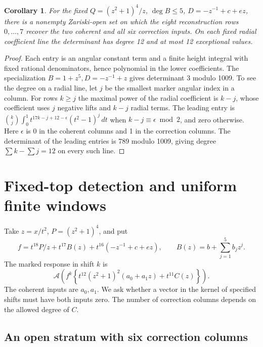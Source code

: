 \documentclass[11pt]{article}
\newtheorem{corollary}[theorem]{Corollary}
\newcommand{\A}{\mathcal A}
\begin{document}
\begin{corollary}\label{cor:generic-eight-row}
For the fixed \(Q=(z^2+1)^4/z\), \(\deg B\le5\),
\(D=-z^{-1}+c+ez\), there is a nonempty Zariski-open set
on which the eight reconstruction rows \(0,\ldots,7\)
recover the two coherent and all six correction inputs.
On each fixed radial coefficient line the determinant
has degree 12 and at most 12 exceptional values.
\end{corollary}
\begin{proof}
Each entry is an angular constant term and a finite
height integral with fixed rational denominators,
hence polynomial in the lower coefficients.
The specialization \(B=1+z^5,D=-z^{-1}+z\) gives
determinant 3 modulo 1009. To see the degree on a
radial line, let \(j\) be the smallest marker angular
index in a column. For rows \(k\ge j\) the maximal
power of the radial coefficient is \(k-j\), whose
coefficient uses \(j\) negative lifts and \(k-j\)
radial terms. The leading entry is
\(\binom{k}{j}\int_0^1 t^{17k-j+12-\epsilon}(t^2-1)^j\,dt\)
when \(k-j\equiv\epsilon\bmod2\), and zero otherwise.
Here \(\epsilon\) is 0 in the coherent columns and 1
in the correction columns. The determinant of the
leading entries is 789 modulo 1009, giving degree
\(\sum k-\sum j=12\) on every such line.
\end{proof}


\section{Fixed-top detection and uniform finite windows}
\label{sec:fixed-top-windows}

Take \(z=x/t^2\), \(P=(z^2+1)^4\), and put
\[
 f=t^{18}P/z+t^{17}B(z)+t^{16}(-z^{-1}+c+ez),\qquad
 B(z)=b+\sum_{j=1}^5 b_jz^j.
\]
The marked response in shift \(k\) is
\[
 \A\!\left(f^k\left\{t^{12}(z^2+1)^2(a_0+a_1z)+t^{11}C(z)\right\}\right).
\]
The coherent inputs are \(a_0,a_1\). We ask whether a vector in
the kernel of specified shifts must have both inputs zero.
The number of correction columns depends on the allowed degree of \(C\).

\subsection{An open stratum with six correction columns}
\end{document}
